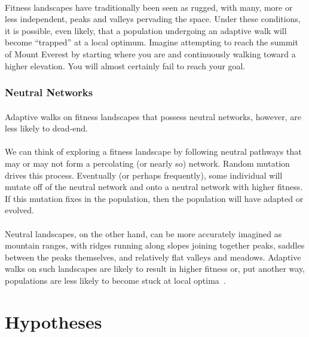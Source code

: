\documentclass[12pt,letterpaper,titlepage,draft]{article}
\begin{document}
\paragraph{}
Fitness landscapes have traditionally been seen as rugged, with many, more or
less independent, peaks and valleys pervading the space. Under these
conditions, it is possible, even likely, that a population undergoing an
adaptive walk will become ``trapped'' at a local optimum. Imagine attempting to
reach the summit of Mount Everest by starting where you are and continuously
walking toward a higher elevation. You will almost certainly fail to reach your
goal.

\subsubsection{Neutral Networks}

\paragraph{}
Adaptive walks on fitness landscapes that possess neutral networks, however,
are less likely to dead-end.

\paragraph{}
We can think of exploring a fitness landscape by following neutral pathways
that may or may not form a percolating (or nearly so) network. Random mutation
drives this process. Eventually (or perhaps frequently), some individual will
mutate off of the neutral network and onto a neutral network with higher
fitness. If this mutation fixes in the population, then the population will
have adapted or evolved.

\paragraph{}
Neutral landscapes, on the other hand, can be more accurately imagined as
mountain ranges, with ridges running along slopes joining together peaks,
saddles between the peaks themselves, and relatively flat valleys and meadows.
Adaptive walks on such landscapes are likely to result in higher fitness or,
put another way, populations are less likely to become stuck at local
optima~\cite{Newman1998}.

\section{Hypotheses}
\end{document}
